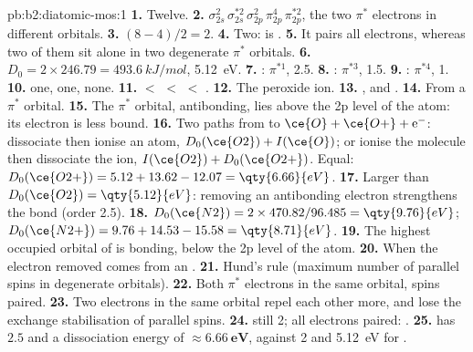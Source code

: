 \begin{solution}{pb:b2:diatomic-mos:1}
\textbf{1.} Twelve.
\textbf{2.} $\sigma_{2s}^2\,\sigma_{2s}^{*2}\,\sigma_{2p}^2\,\pi_{2p}^4\,\pi_{2p}^{*2}$, the two $\pi^*$
electrons in different orbitals.
\textbf{3.} $(8 - 4)/2 = 2$.
\textbf{4.} Two:  is .
\textbf{5.} It pairs all electrons, whereas two of them sit alone in two degenerate
$\pi^*$ orbitals.
\textbf{6.} $D_0 = 2 \times 246.79 = \qty{493.6}{kJ/mol}$, \qty{5.12}{eV}.
\textbf{7.} : $\pi^{*1}$,  2.5.
\textbf{8.} : $\pi^{*3}$,  1.5.
\textbf{9.} : $\pi^{*4}$,  1.
\textbf{10.}  one,  one,  none.
\textbf{11.}  $<$  $<$  $<$ .
\textbf{12.} The peroxide ion.
\textbf{13.} ,  and .
\textbf{14.} From a $\pi^*$ orbital.
\textbf{15.} The $\pi^*$ orbital, antibonding, lies above the 2p level of the atom: its
electron is less bound.
\textbf{16.} Two paths from  to $\ce{O} + \ce{O+} + \mathrm e^-$: dissociate then
ionise an atom, $D_0(\ce{O2}) + I(\ce{O})$; or ionise the molecule then dissociate the ion,
$I(\ce{O2}) + D_0(\ce{O2+})$. Equal: $D_0(\ce{O2+}) = 5.12 + 13.62 - 12.07 = \qty{6.66}{eV}$.
\textbf{17.} Larger than $D_0(\ce{O2}) = \qty{5.12}{eV}$: removing an antibonding electron
strengthens the bond (order 2.5).
\textbf{18.} $D_0(\ce{N2}) = 2 \times 470.82/96.485 = \qty{9.76}{eV}$; $D_0(\ce{N2+}) = 9.76 +
14.53 - 15.58 = \qty{8.71}{eV}$.
\textbf{19.} The highest occupied orbital of  is bonding, below the 2p level of the
atom.
\textbf{20.} When the electron removed comes from an .
\textbf{21.} Hund's rule (maximum number of parallel spins in degenerate orbitals).
\textbf{22.} Both $\pi^*$ electrons in the same orbital, spins paired.
\textbf{23.} Two electrons in the same orbital repel each other more, and lose the
exchange stabilisation of parallel spins.
\textbf{24.}  still 2; all electrons paired: .
\textbf{25.}  has  $\boldsymbol{2.5}$ and a dissociation energy of
$\boldsymbol{\approx \qty{6.66}{eV}}$, against 2 and \qty{5.12}{eV} for .
\end{solution}
